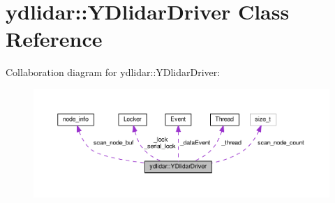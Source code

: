 \hypertarget{classydlidar_1_1_y_dlidar_driver}{}\section{ydlidar\+:\+:Y\+Dlidar\+Driver Class Reference}
\label{classydlidar_1_1_y_dlidar_driver}


Collaboration diagram for ydlidar\+:\+:Y\+Dlidar\+Driver\+:
\nopagebreak
\begin{figure}[H]
\begin{center}
\leavevmode
\includegraphics[width=350pt]{classydlidar_1_1_y_dlidar_driver__coll__graph}
\end{center}
\end{figure}
